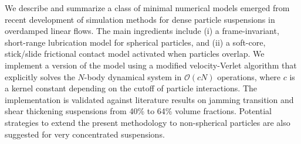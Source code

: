 \begin{paper}

\makepapertitle

%
\begin{paperabstract}
	We describe and summarize a class of minimal numerical models emerged from recent development of simulation methods for
        dense particle suspensions in overdamped linear flows.
        The main ingredients include
        (i) a frame-invariant, short-range lubrication model for spherical particles, and
        (ii) a soft-core, stick/slide frictional contact model activated when particles overlap.
        We implement a version of the model using a modified velocity-Verlet algorithm that
        explicitly solves the $N$-body dynamical system in $\mathcal{O}(cN)$ operations,
        where $c$ is a kernel constant depending on the cutoff of particle interactions.
        The implementation is validated against literature results on jamming transition and shear thickening suspensions from 40\% to 64\% volume fractions.
        Potential strategies to extend the present methodology to non-spherical particles are also suggested for very concentrated suspensions.

\end{paperabstract}


%



%


%


\end{paper}
